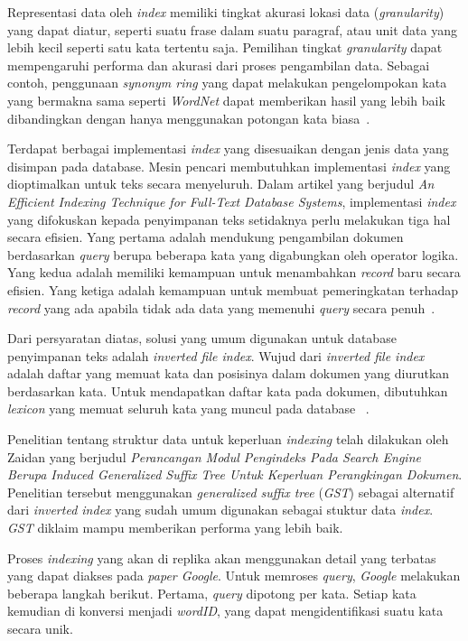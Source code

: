 Representasi data oleh \emph{index} memiliki tingkat akurasi lokasi data
(\emph{granularity}) yang dapat diatur, seperti suatu frase dalam suatu
paragraf, atau unit data yang lebih kecil seperti satu kata tertentu saja.
Pemilihan tingkat \emph{granularity} dapat mempengaruhi performa dan akurasi
dari proses pengambilan data. Sebagai contoh, penggunaan \emph{synonym ring}
yang dapat melakukan pengelompokan kata yang bermakna sama seperti
\emph{WordNet} dapat memberikan hasil yang lebih baik dibandingkan dengan hanya
menggunakan potongan kata biasa~\cite{gonzalo1998wordnet}.

Terdapat berbagai implementasi \emph{index} yang disesuaikan dengan jenis data
yang disimpan pada database. Mesin pencari membutuhkan implementasi \emph{index}
yang dioptimalkan untuk teks secara menyeluruh. Dalam artikel yang berjudul
\emph{An Efficient Indexing Technique for Full-Text Database Systems}, 
implementasi \emph{index} yang difokuskan kepada penyimpanan teks setidaknya
perlu melakukan tiga hal secara efisien. Yang pertama adalah mendukung
pengambilan dokumen berdasarkan \emph{query} berupa beberapa kata yang
digabungkan oleh operator logika. Yang kedua adalah memiliki kemampuan untuk
menambahkan \emph{record} baru secara efisien. Yang ketiga adalah kemampuan
untuk membuat pemeringkatan terhadap \emph{record} yang ada apabila tidak ada
data yang memenuhi \emph{query} secara penuh~\cite{zobel1992efficient}.

Dari persyaratan diatas, solusi yang umum digunakan untuk database penyimpanan
teks adalah \emph{inverted file index}. Wujud dari \emph{inverted file index}
adalah daftar yang memuat kata dan posisinya dalam dokumen yang diurutkan
berdasarkan kata.  Untuk mendapatkan daftar kata pada dokumen, dibutuhkan
\emph{lexicon} yang memuat seluruh kata yang muncul pada database
~\cite{hersh2001gigabytes}.

Penelitian tentang struktur data untuk keperluan \emph{indexing} telah dilakukan
oleh Zaidan yang berjudul \emph{Perancangan Modul Pengindeks Pada Search Engine
Berupa Induced Generalized Suffix Tree Untuk Keperluan Perangkingan Dokumen}.
Penelitian tersebut menggunakan \emph{generalized suffix tree} (\emph{GST})
sebagai alternatif dari \emph{inverted index} yang sudah umum digunakan sebagai
stuktur data \emph{index}. \emph{GST} diklaim mampu memberikan performa yang
lebih baik.

Proses \emph{indexing} yang akan di replika akan menggunakan detail yang
terbatas yang dapat diakses pada \emph{paper Google}.  Untuk memroses
\emph{query}, \emph{Google} melakukan beberapa langkah berikut.  Pertama,
\emph{query} dipotong per kata. Setiap kata kemudian di konversi menjadi
\emph{wordID}, yang dapat mengidentifikasi suatu kata secara unik.

